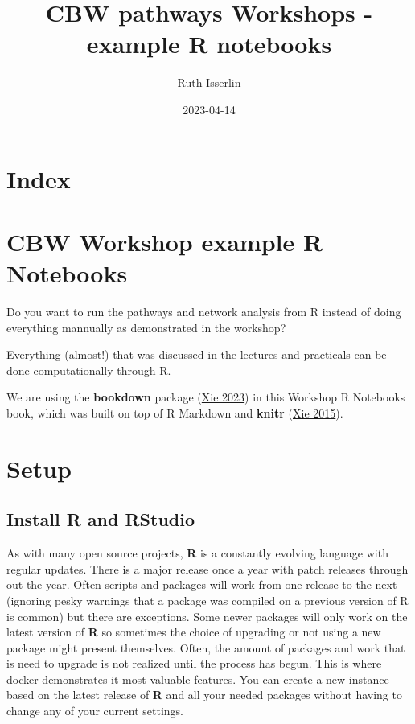 \documentclass[
]{book}
\title{CBW pathways Workshops - example R notebooks}
\author{Ruth Isserlin}
\date{2023-04-14}
\begin{document}
\maketitle

{
\setcounter{tocdepth}{1}
\tableofcontents
}
\hypertarget{index}{%
\chapter{Index}\label{index}}

\hypertarget{intro}{%
\chapter{CBW Workshop example R Notebooks}\label{intro}}

Do you want to run the pathways and network analysis from R instead of doing everything mannually as demonstrated in the workshop?

Everything (almost!) that was discussed in the lectures and practicals can be done computationally through R.

We are using the \textbf{bookdown} package (\protect\hyperlink{ref-R-bookdown}{Xie 2023}) in this Workshop R Notebooks book, which was built on top of R Markdown and \textbf{knitr} (\protect\hyperlink{ref-xie2015}{Xie 2015}).

\hypertarget{setup}{%
\chapter{Setup}\label{setup}}

\hypertarget{install-r-and-rstudio}{%
\section{Install R and RStudio}\label{install-r-and-rstudio}}

As with many open source projects, \textbf{R} is a constantly evolving language with regular updates. There is a major release once a year with patch releases through out the year. Often scripts and packages will work from one release to the next (ignoring pesky warnings that a package was compiled on a previous version of R is common) but there are exceptions. Some newer packages will only work on the latest version of \textbf{R} so sometimes the choice of upgrading or not using a new package might present themselves. Often, the amount of packages and work that is need to upgrade is not realized until the process has begun. This is where docker demonstrates it most valuable features. You can create a new instance based on the latest release of \textbf{R} and all your needed packages without having to change any of your current settings.
\end{document}
